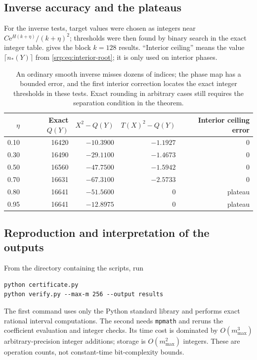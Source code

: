 \documentclass[11pt,a4paper]{article}
\numberwithin{equation}{section}
\theoremstyle{definition}
\theoremstyle{remark}
\newcommand{\e}{\mathrm e}
\begin{document}
\subsection{Inverse accuracy and the plateaus}
For the inverse tests, target values were chosen as integers near
$C\e^{H(k+\eta)}/(k+\eta)^2$; thresholds were then found by binary search
in the exact integer table.  gives the block
$k=128$ results. ``Interior ceiling'' means the value
$\lceil n_*(Y)\rceil$ from \eqref{srp:eq:interior-root}; it is only used on
interior phases.
\begin{table}[htbp]
\centering\small
\begin{tabular}{r r r r r}
\toprule
$\eta$ & Exact $Q(Y)$ & $X^2-Q(Y)$ & $T(X)^2-Q(Y)$ & Interior ceiling error\\
\midrule
0.10 & 16420 & $-10.3900$ & $-1.1927$ & 0\\
0.30 & 16490 & $-29.1100$ & $-1.4673$ & 0\\
0.50 & 16560 & $-47.7500$ & $-1.5942$ & 0\\
0.70 & 16631 & $-67.3100$ & $-2.5733$ & 0\\
0.80 & 16641 & $-51.5600$ & $0$ & plateau\\
0.95 & 16641 & $-12.8975$ & $0$ & plateau\\
\bottomrule
\end{tabular}
\caption{An ordinary smooth inverse misses dozens of indices; the
phase map has a bounded error, and the first interior correction locates
the exact integer thresholds in these tests. Exact rounding in arbitrary
cases still requires the separation condition in the theorem.}
\label{srp:tab:inverse-errors}
\end{table}

\subsection{Reproduction and interpretation of the outputs}
From the directory containing the scripts, run
\begin{lstlisting}
python certificate.py
python verify.py --max-m 256 --output results
\end{lstlisting}
The first command uses only the Python standard library and performs
exact rational interval computations. The second needs \texttt{mpmath}
and reruns the coefficient evaluation and integer checks. Its time cost
is dominated by $O(m_{\max}^3)$ arbitrary-precision integer additions;
storage is $O(m_{\max}^2)$ integers. These are operation counts, not
constant-time bit-complexity bounds.
\end{document}
